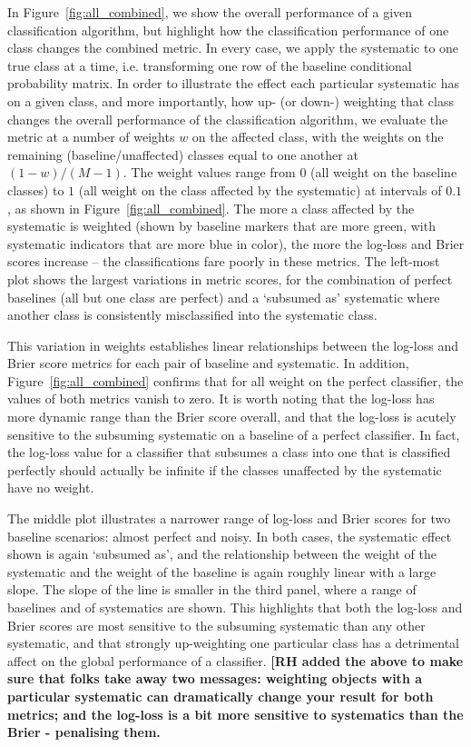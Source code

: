 In Figure~\ref{fig:all_combined}, we show the overall performance of a given classification algorithm, but highlight how the classification performance of one class changes the combined metric. In every case, we apply the systematic to one true class at a time, i.e. transforming one row of the baseline conditional probability matrix. 
In order to illustrate the effect each particular systematic has on a given class, and more importantly, how up- (or down-) weighting that class changes the overall performance of the classification algorithm, we evaluate the metric at a number of weights $w$ on the affected class, with the weights on the remaining (baseline/unaffected) classes equal to one another at $(1 - w) / (M - 1)$.
The weight values range from $0$ (all weight on the baseline classes) to $1$ (all weight on the class affected by the systematic) at intervals of $0.1$, as shown in Figure~\ref{fig:all_combined}. The more a class affected by the systematic is weighted (shown by baseline markers that are more green, with systematic indicators that are more blue in color), the more the log-loss and Brier scores increase -- the classifications fare poorly in these metrics. The left-most plot shows the largest variations in metric scores, for the combination of perfect baselines (all but one class are perfect) and a `subsumed as' systematic where another class is consistently misclassified into the systematic class. 

This variation in weights establishes linear relationships between the log-loss and Brier score metrics for each pair of baseline and systematic. In addition, Figure~\ref{fig:all_combined} confirms that for all weight on the perfect classifier, the values of both metrics vanish to zero. It is worth noting that the log-loss has more dynamic range than the Brier score overall, and that the log-loss is acutely sensitive to the subsuming systematic on a baseline of a perfect classifier. In fact, the log-loss value for a classifier that subsumes a class into one that is classified perfectly should actually be infinite if the classes unaffected by the systematic have no weight.

The middle plot illustrates a narrower range of log-loss and Brier scores for two baseline scenarios: almost perfect and noisy.
In both cases, the systematic effect shown is again `subsumed as', and the relationship between the weight of the systematic and the weight of the baseline is again roughly linear with a large slope. 
The slope of the line is smaller in the third panel, where a range of baselines and of systematics are shown. This highlights that both the log-loss and Brier scores are most sensitive to the subsuming systematic than any other systematic, and that strongly up-weighting one particular class has a detrimental affect on the global performance of a classifier.
\textbf{[RH added the above to make sure that folks take away two messages: weighting objects with a particular systematic can dramatically change your result for both metrics; and the log-loss is a bit more sensitive to systematics than the Brier - penalising them.}

